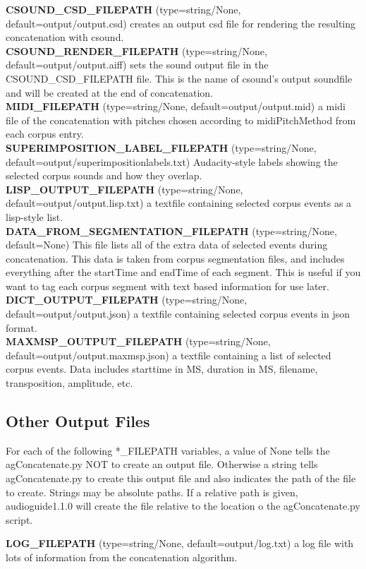 \documentclass{article}
\newcommand{\optEntry}[4]{\textbf{#1} (type=#2, default=#3) #4\hspace{0.5em}\\}
\newcommand{\ag}{audioguide1.1.0\xspace}
\begin{document}
\begin{spacing}{1.2}
\optEntry{CSOUND\_CSD\_FILEPATH}{string/None}{output/output.csd}{creates an output csd file for rendering the resulting concatenation with csound.}

\optEntry{CSOUND\_RENDER\_FILEPATH}{string/None}{output/output.aiff}{sets the sound output file in the CSOUND\_CSD\_FILEPATH file.  This is the name of csound's output soundfile and will be created at the end of concatenation.}

\optEntry{MIDI\_FILEPATH}{string/None}{output/output.mid}{a midi file of the concatenation with pitches chosen according to midiPitchMethod from each corpus entry.}

\optEntry{SUPERIMPOSITION\_LABEL\_FILEPATH}{string/None}{output/superimpositionlabels.txt}{Audacity-style labels showing the selected corpus sounds and how they overlap.}

\optEntry{LISP\_OUTPUT\_FILEPATH}{string/None}{output/output.lisp.txt}{a textfile containing selected corpus events as a lisp-style list.}

\optEntry{DATA\_FROM\_SEGMENTATION\_FILEPATH}{string/None}{None}{This file lists all of the extra data of selected events during concatenation.  This data is taken from corpus segmentation files, and includes everything after the startTime and endTime of each segment.  This is useful if you want to tag each corpus segment with text based information for use later.}

\optEntry{DICT\_OUTPUT\_FILEPATH}{string/None}{output/output.json}{a textfile containing selected corpus events in json format.}

\optEntry{MAXMSP\_OUTPUT\_FILEPATH}{string/None}{output/output.maxmsp.json}{a textfile containing a list of selected corpus events.  Data includes starttime in MS, duration in MS, filename, transposition, amplitude, etc.}


\subsection{Other Output Files}\label{otheroutputfiles}
For each of the following *\_FILEPATH variables, a value of None tells the agConcatenate.py NOT to create an output file.  Otherwise a string tells agConcatenate.py to create this output file and also indicates the path of the file to create.  Strings may be absolute paths.  If a relative path is given, \ag will create the file relative to the location o the agConcatenate.py script.

\optEntry{LOG\_FILEPATH}{string/None}{output/log.txt}{a log file with lots of information from the concatenation algorithm.}


\end{spacing}
\end{document}
